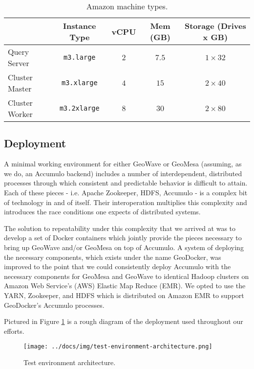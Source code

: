 \begin{table}[h!tb]
  \centering
  \begin{tabular}{ | l | c | c | c | c | }
    \hline
    & Instance Type & vCPU & Mem (GB) & Storage (Drives x GB) \\ \hline
    Query Server & \texttt{m3.large} & $2$ & $7.5$ & $1\times32$ \\
    Cluster Master & \texttt{m3.xlarge} & $4$ & $15$ & $2\times40$ \\
    Cluster Worker & \texttt{m3.2xlarge} & $8$ & $30$ & $2\times80$ \\
    \hline
  \end{tabular}
  \caption{Amazon machine types.}
  \label{table:machines}
\end{table}

\subsection{Deployment}
\label{sec:performance:deployment}

A minimal working environment for either GeoWave or GeoMesa (assuming, as we do, an Accumulo backend) includes a number of interdependent, distributed processes through which consistent and predictable behavior is difficult to attain.
Each of these pieces - i.e. Apache Zookeeper, HDFS, Accumulo - is a complex bit of technology in and of itself. Their interoperation multiplies this complexity and introduces the race conditions one expects of distributed systems.

The solution to repeatability under this complexity that we arrived at was to develop a set of Docker containers which jointly provide the pieces necessary to bring up GeoWave and/or GeoMesa on top of Accumulo.
A system of deploying the necessary components, which exists under the name GeoDocker, was improved to the point that we could consistently deploy Accumulo with the necessary components for GeoMesa and GeoWave to identical Hadoop clusters on Amazon Web Service's (AWS) Elastic Map Reduce (EMR).
We opted to use the YARN, Zookeeper, and HDFS which is distributed on Amazon EMR to support GeoDocker’s Accumulo processes.

Pictured in Figure \ref{deployment} is a rough diagram of the deployment used throughout our efforts.

\begin{figure}[h!tb]
  \centering
  \texttt{[image: ../docs/img/test-environment-architecture.png]}
  \caption{Test environment architecture.}
  \label{deployment}
\end{figure}

